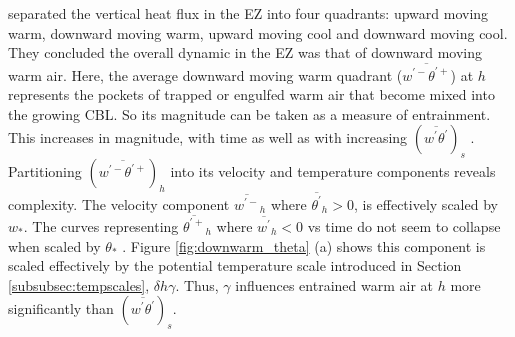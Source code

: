 \cite{SullMoengStev} separated the vertical heat flux in the EZ into four quadrants: upward moving warm, downward moving warm, upward moving cool and downward moving cool. They concluded the overall dynamic in the EZ was that of downward moving warm air. Here, the average downward moving warm quadrant ($\overline{w^{'-}\theta^{'+}}$) at $h$ represents the pockets of trapped or engulfed warm air that become mixed into the growing CBL.  So its magnitude can be taken as a measure of entrainment.  This increases in magnitude, with time as well as with increasing $(\overline{w^{'}\theta^{'}})_{s}$ \citep{NChap14}.  Partitioning $(\overline{w^{'-}\theta^{'+}})_{h}$ into its velocity and temperature components reveals complexity.  The velocity component $\overline{w^{'-}}_{h}$  where $ \overline{\theta^{'}}_{h}>0$, is effectively scaled by $w_{*}$.  The curves representing $\overline{\theta^{'+}}_{h}$ where $\overline{w^{'}}_{h}<0$ vs time do not seem to collapse when scaled by $\theta_{*}$ \citep{NChap14}.  Figure \ref{fig:downwarm_theta} (a) shows this component is scaled effectively by the potential temperature scale introduced in Section \ref{subsubsec:tempscales}, $\delta h \gamma$.  Thus, $\gamma$ influences entrained warm air at $h$ more significantly than $(\overline{w^{'}\theta^{'}})_{s}$.\\ 
\\   

